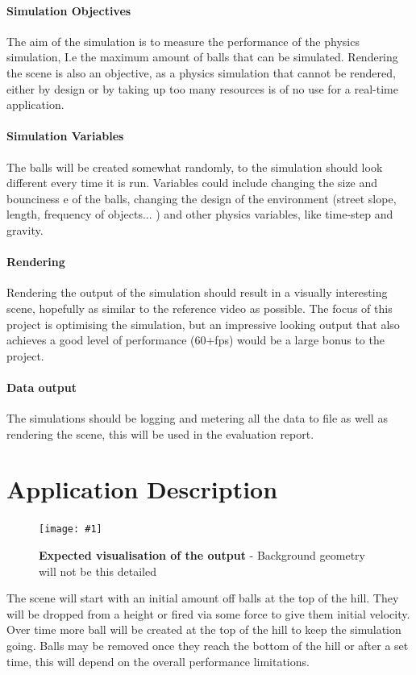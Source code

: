 \documentclass[conference]{acmsiggraph}
\newcommand{\figuremacroW}[4]{
	\begin{figure}[h] %
		\centering
		\texttt{[image: \#1]}
		\caption[#2]{\textbf{#2} - #3}
		\label{fig:#1}
	\end{figure}
}
\begin{document}
\paragraph{Simulation Objectives}
The aim of the simulation is to measure the performance of the physics simulation, I.e the maximum amount of balls that can be simulated. Rendering the scene is also an objective, as a physics simulation that cannot be rendered, either by design or by taking up too many resources is of no use for a real-time application.

\paragraph{Simulation Variables}
The balls will be created somewhat randomly, to the simulation should look different every time it is run. Variables could include changing the size and bounciness e of the balls, changing the design of the environment (street slope, length, frequency of objects... ) and other physics variables, like time-step and gravity.

\paragraph{Rendering}
Rendering the output of the simulation should result in a visually interesting scene, hopefully as similar to the reference video as possible. The focus of this project is optimising the simulation, but an impressive looking output that also achieves a good level of performance (60+fps) would be a large bonus to the project.

\paragraph{Data output}
The simulations should be logging and metering all the data to file as well as rendering the scene, this will be used in the evaluation report.

\section{Application Description}

\figuremacroW
{balls2}
{Expected visualisation of the output}
{Background geometry will not be this detailed \protect\cite{advert}}
{0.96}

The scene will start with an initial amount off balls at the top of the hill. They will be dropped from a height or fired via some force to give them initial velocity. Over time more ball will be created at the top of the hill to keep the simulation going. Balls may be removed once they reach the bottom of the hill or after a set time, this will depend on the overall performance limitations.
\end{document}

